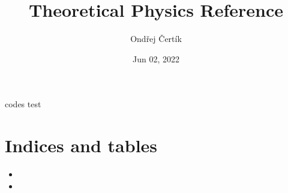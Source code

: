 \documentclass[letterpaper,10pt,english]{sphinxmanual}
\title{Theoretical Physics Reference}
\date{Jun 02, 2022}
\author{Ondřej Čertík}
\begin{document}
\pagestyle{empty}
\sphinxmaketitle
\pagestyle{plain}
\sphinxtableofcontents
\pagestyle{normal}
\label{\detokenize{index::doc}}


\sphinxAtStartPar
codes test


\chapter{Indices and tables}
\label{\detokenize{index:indices-and-tables}}\begin{itemize}
\item {} 
\sphinxAtStartPar
{}

\item {} 
\sphinxAtStartPar
{}

\end{itemize}



\renewcommand{\indexname}{Index}
\printindex
\end{document}
